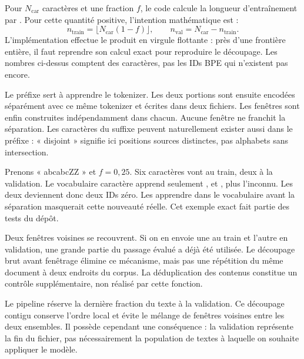 Pour \(N_{\mathrm{car}}\) caractères et une fraction \(f\), le code calcule
la longueur d'entraînement par .
Pour cette quantité positive, l'intention mathématique est :
\[
    n_{\mathrm{train}}=\lfloor N_{\mathrm{car}}(1-f)\rfloor,
    \qquad n_{\mathrm{val}}=N_{\mathrm{car}}-n_{\mathrm{train}}.
\]
L'implémentation effectue le produit en virgule flottante : près d'une
frontière entière, il faut reprendre son calcul exact pour reproduire
le découpage. Les nombres ci-dessus comptent des caractères, pas les
IDs BPE qui n'existent pas encore.

Le préfixe sert à apprendre le tokenizer. Les deux portions sont ensuite
encodées séparément avec ce même tokenizer et écrites dans deux fichiers.
Les fenêtres sont enfin construites indépendamment dans chacun.
Aucune fenêtre ne franchit la séparation. Les caractères du suffixe
peuvent naturellement exister aussi dans le préfixe : « disjoint »
signifie ici positions sources distinctes, pas alphabets sans intersection.

Prenons « abcabcZZ » et \(f=0{,}25\). Six caractères vont au train,
deux à la validation. Le vocabulaire caractère apprend seulement
,  et , plus l'inconnu.
Les deux  deviennent donc deux IDs zéro. Les apprendre dans
le vocabulaire avant la séparation masquerait cette nouveauté réelle.
Cet exemple exact fait partie des tests du dépôt.

Deux fenêtres voisines se recouvrent. Si on en envoie une au train et l'autre
en validation, une grande partie du passage évalué a déjà été utilisée.
Le découpage brut avant fenêtrage élimine ce mécanisme, mais pas une répétition
du même document à deux endroits du corpus.
La déduplication des contenus constitue un contrôle supplémentaire,
non réalisé par cette fonction.


Le pipeline réserve la dernière fraction du texte à la validation.
Ce découpage contigu conserve l'ordre local et évite le mélange de fenêtres
voisines entre les deux ensembles. Il possède cependant une conséquence :
la validation représente la fin du fichier, pas nécessairement la population
de textes à laquelle on souhaite appliquer le modèle.

